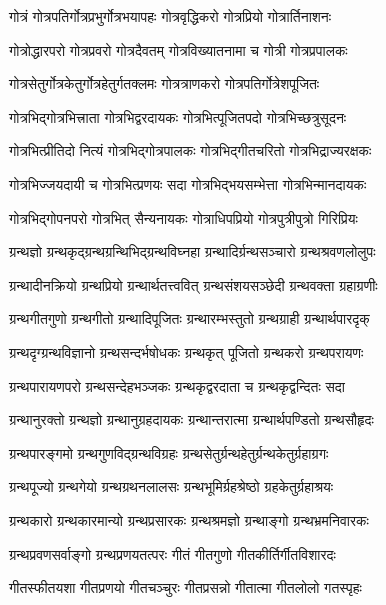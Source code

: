 \twolineshloka
{गोत्रं गोत्रपतिर्गोत्रप्रभुर्गोत्रभयापहः}%
{गोत्रवृद्धिकरो गोत्रप्रियो गोत्रार्तिनाशनः}%

\twolineshloka
{गोत्रोद्धारपरो गोत्रप्रवरो गोत्रदैवतम्}%
{गोत्रविख्यातनामा च गोत्री गोत्रप्रपालकः}%

\twolineshloka
{गोत्रसेतुर्गोत्रकेतुर्गोत्रहेतुर्गतक्लमः}%
{गोत्रत्राणकरो गोत्रपतिर्गोत्रेशपूजितः}%

\twolineshloka
{गोत्रभिद्गोत्रभित्त्राता गोत्रभिद्वरदायकः}%
{गोत्रभित्पूजितपदो गोत्रभिच्छत्रुसूदनः}%

\twolineshloka
{गोत्रभित्प्रीतिदो नित्यं गोत्रभिद्गोत्रपालकः}%
{गोत्रभिद्गीतचरितो गोत्रभिद्राज्यरक्षकः}%

\twolineshloka
{गोत्रभिज्जयदायी च गोत्रभित्प्रणयः सदा}%
{गोत्रभिद्भयसम्भेत्ता गोत्रभिन्मानदायकः}%

\twolineshloka
{गोत्रभिद्गोपनपरो गोत्रभित् सैन्यनायकः}%
{गोत्राधिपप्रियो गोत्रपुत्रीपुत्रो गिरिप्रियः}%

\twolineshloka
{ग्रन्थज्ञो ग्रन्थकृद्ग्रन्थग्रन्थिभिद्ग्रन्थविघ्नहा}%
{ग्रन्थादिर्ग्रन्थसञ्चारो ग्रन्थश्रवणलोलुपः}%

\twolineshloka
{ग्रन्थादीनक्रियो ग्रन्थप्रियो ग्रन्थार्थतत्त्ववित्}%
{ग्रन्थसंशयसञ्छेदी ग्रन्थवक्ता ग्रहाग्रणीः}%

\twolineshloka
{ग्रन्थगीतगुणो ग्रन्थगीतो ग्रन्थादिपूजितः}%
{ग्रन्थारम्भस्तुतो ग्रन्थग्राही ग्रन्थार्थपारदृक्}%

\twolineshloka
{ग्रन्थदृग्ग्रन्थविज्ञानो ग्रन्थसन्दर्भषोधकः}%
{ग्रन्थकृत् पूजितो ग्रन्थकरो ग्रन्थपरायणः}%

\twolineshloka
{ग्रन्थपारायणपरो ग्रन्थसन्देहभञ्जकः}%
{ग्रन्थकृद्वरदाता च ग्रन्थकृद्वन्दितः सदा}%

\twolineshloka
{ग्रन्थानुरक्तो ग्रन्थज्ञो ग्रन्थानुग्रहदायकः}%
{ग्रन्थान्तरात्मा ग्रन्थार्थपण्डितो ग्रन्थसौहृदः}%

\twolineshloka
{ग्रन्थपारङ्गमो ग्रन्थगुणविद्ग्रन्थविग्रहः}%
{ग्रन्थसेतुर्ग्रन्थहेतुर्ग्रन्थकेतुर्ग्रहाग्रगः}%

\twolineshloka
{ग्रन्थपूज्यो ग्रन्थगेयो ग्रन्थग्रथनलालसः}%
{ग्रन्थभूमिर्ग्रहश्रेष्ठो ग्रहकेतुर्ग्रहाश्रयः}%

\twolineshloka
{ग्रन्थकारो ग्रन्थकारमान्यो ग्रन्थप्रसारकः}%
{ग्रन्थश्रमज्ञो ग्रन्थाङ्गो ग्रन्थभ्रमनिवारकः}%

\twolineshloka
{ग्रन्थप्रवणसर्वाङ्गो ग्रन्थप्रणयतत्परः}%
{गीतं गीतगुणो गीतकीर्तिर्गीतविशारदः}%

\twolineshloka
{गीतस्फीतयशा गीतप्रणयो गीतचञ्चुरः}%
{गीतप्रसन्नो गीतात्मा गीतलोलो गतस्पृहः}%

